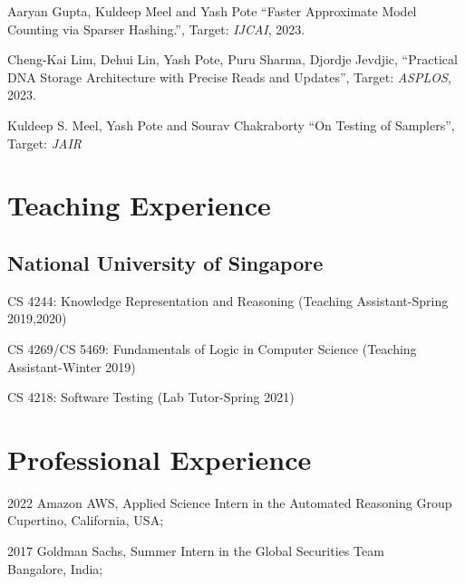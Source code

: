\documentclass[12pt,letterpaper]{report}
\newcommand{\listitemspace}{0.15em}
\renewenvironment{itemize}
{\begin{list}{}{\setlength{\leftmargin}{0em}
            \setlength{\parskip}{0em}
            \setlength{\itemsep}{\listitemspace}
            \setlength{\parsep}{\listitemspace}}}
    {\end{list}}
\begin{document}
    \begin{tablist}
		
		\item[\the\year] \tab  Aaryan Gupta,  Kuldeep Meel and Yash Pote
		 \enquote{Faster Approximate Model Counting via Sparser Hashing.}, Target: \textit{IJCAI},  2023.
		
		\item[\the\year] \tab  Cheng-Kai Lim, Dehui Lin, Yash Pote,  Puru Sharma, Djordje Jevdjic, \enquote{Practical DNA Storage Architecture with Precise Reads and
			Updates}, Target: \textit{ASPLOS},  2023.
			
		\item[\the\year] \tab Kuldeep S. Meel, Yash Pote  and Sourav Chakraborty \enquote{On Testing of Samplers}, Target: \textit{JAIR}
	
    \end{tablist}


    \section*{Teaching Experience}

    \subsection*{National University of Singapore}
    
    \begin{itemize}
    	  	
 \item   CS 4244: Knowledge Representation and Reasoning (Teaching Assistant-Spring 2019,2020)
  \item   CS 4269/CS 5469: Fundamentals of Logic in Computer Science (Teaching Assistant-Winter 2019)
  \item   CS 4218: Software Testing (Lab Tutor-Spring 2021)
    
	\end{itemize}
    
    \section*{Professional Experience}
    \begin{tablist}
        \item[2022] \tab Amazon AWS, Applied Science Intern in the Automated Reasoning Group\\
        Cupertino, California, USA;
    \end{tablist}
    \begin{tablist}
        \item[2017] \tab Goldman Sachs, Summer Intern in the Global Securities Team\\
        Bangalore, India;
    \end{tablist}
\end{document}
